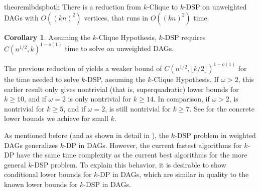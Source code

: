 \documentclass[11pt]{article}
\theoremstyle{definition}
\newtheorem{corollary}[theorem]{Corollary}
\begin{document}
\begin{restatable}{theorem}{lbdspboth}
    \label{lbdspboth}
    There is a reduction from \textsf{$k$-Clique}  to \textsf{$k$-DSP} on unweighted DAGs with $O((kn)^2)$ vertices, that runs in $O((kn)^2)$ time.
\end{restatable}





\begin{corollary}
\label{cor:dsp}
    Assuming the \textsf{$k$-Clique Hypothesis}, \textsf{$k$-DSP} requires $C(n^{1/2},k)^{1-o(1)}$ time to solve on unweighted DAGs.
\end{corollary}

The previous reduction of \cite{Geometric-Lens-conf}  yields a  weaker bound of $C(n^{1/2},\lfloor k/2\rfloor )^{1-o(1)}$ for the time needed to solve \textsf{$k$-DSP}, assuming the \textsf{$k$-Clique} Hypothesis.
If $\omega > 2$, this earlier result only gives nontrivial (that is, superquadratic) lower bounds for $k\ge 10$, and if $\omega  = 2$ is only nontrivial for $k\ge 14$.
In comparison, if $\omega > 2$,  is nontrivial for $k\ge 5$, and if $\omega = 2$,  is still nontrivial for $k\ge 7$.
See  for the concrete lower bounds we achieve for small $k$.

As mentioned before (and as shown in detail in ), the \textsf{$k$-DSP} problem in weighted DAGs generalizes \textsf{$k$-DP} in DAGs.
However, the current fastest algorithms for \textsf{$k$-DP} have the same time complexity as the current best algorithms for the more general \textsf{$k$-DSP} problem.
To explain this behavior, it is desirable to show conditional lower bounds for \textsf{$k$-DP} in DAGs, which are similar in quality to the known lower bounds for \textsf{$k$-DSP} in DAGs.
\end{document}
